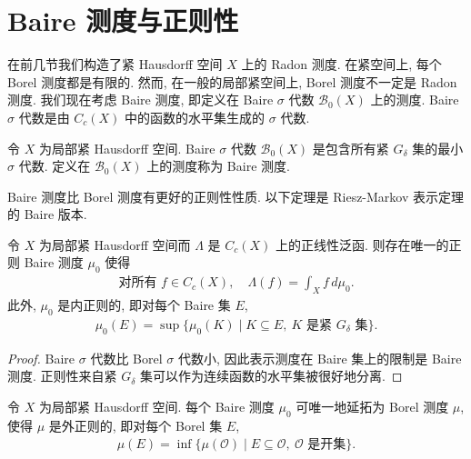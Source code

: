 \documentclass[../../main.tex]{subfiles}
\begin{document}
\section{Baire 测度与正则性}\label{section:ch21-baire}

在前几节我们构造了紧 Hausdorff 空间 $X$ 上的 Radon 测度. 在紧空间上, 每个 Borel 测度都是有限的. 然而, 在一般的局部紧空间上, Borel 测度不一定是 Radon 测度. 我们现在考虑 Baire 测度, 即定义在 Baire $\sigma$ 代数 $\mathcal{B}_{0}(X)$ 上的测度. Baire $\sigma$ 代数是由 $C_{c}(X)$ 中的函数的水平集生成的 $\sigma$ 代数.

\begin{definition}[Baire 测度]\label{definition:ch21-baire测度}
令 $X$ 为局部紧 Hausdorff 空间. Baire $\sigma$ 代数 $\mathcal{B}_{0}(X)$ 是包含所有紧 $G_{\delta}$ 集的最小 $\sigma$ 代数. 定义在 $\mathcal{B}_{0}(X)$ 上的测度称为 Baire 测度.
\end{definition}

Baire 测度比 Borel 测度有更好的正则性性质. 以下定理是 Riesz-Markov 表示定理的 Baire 版本.

\begin{theorem}\label{theorem:ch21-baire表示}
令 $X$ 为局部紧 Hausdorff 空间而 $\Lambda$ 是 $C_{c}(X)$ 上的正线性泛函. 则存在唯一的正则 Baire 测度 $\mu_{0}$ 使得
\begin{align*}
\text{对所有 }f\in C_{c}(X),\quad\Lambda(f)=\int_{X}f\,d\mu_{0}.
\end{align*}
此外, $\mu_{0}$ 是内正则的, 即对每个 Baire 集 $E$,
\begin{align*}
\mu_{0}(E)=\sup\{\mu_{0}(K)\mid K\subseteq E,\ K\text{ 是紧 }G_{\delta}\text{ 集}\}.
\end{align*}
\end{theorem}

\begin{proof}
Baire $\sigma$ 代数比 Borel $\sigma$ 代数小, 因此表示测度在 Baire 集上的限制是 Baire 测度. 正则性来自紧 $G_{\delta}$ 集可以作为连续函数的水平集被很好地分离.
\end{proof}

\begin{theorem}\label{theorem:ch21-borel到baire}
令 $X$ 为局部紧 Hausdorff 空间. 每个 Baire 测度 $\mu_{0}$ 可唯一地延拓为 Borel 测度 $\mu$, 使得 $\mu$ 是外正则的, 即对每个 Borel 集 $E$,
\begin{align*}
\mu(E)=\inf\{\mu(\mathcal{O})\mid E\subseteq\mathcal{O},\ \mathcal{O}\text{ 是开集}\}.
\end{align*}
\end{theorem}
\end{document}
